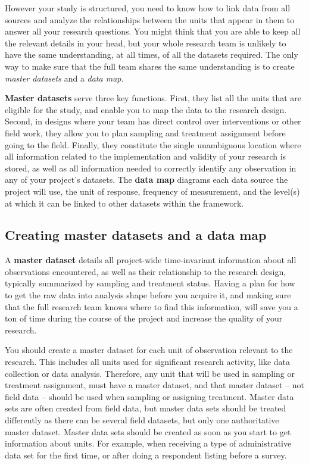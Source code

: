 However your study is structured, you need to know how to link data from all sources
and analyze the relationships between the units that appear in them
to answer all your research questions.
You might think that you are able to keep all the relevant details in your head,
but your whole research team is unlikely to have the same understanding,
at all times, of all the datasets required.
The only way to make sure that the full team shares the same understanding
is to create \textit{master datasets} and a \textit{data map}.

\textbf{Master datasets} serve three key functions.
First, they list all the units that are eligible for the study,
and enable you to map the data to the research design.
Second, in designs where your team has direct control over interventions or other field work,
they allow you to plan sampling and treatment assignment before going to the field.
Finally, they constitute the single unambiguous location where all information 
related to the implementation and validity of your research is stored,
as well as all information needed to correctly identify any observation in any of your project's datasets.
The \textbf{data map} diagrams each data source the project will use, 
the unit of response, frequency of measurement, 
and the level(s) at which it can be linked to other datasets within the framework. 


\subsection{Creating master datasets and a data map}

A \textbf{master dataset}
details all project-wide time-invariant information
about all observations encountered,
as well as their relationship to the research design,
typically summarized by sampling and treatment status.
Having a plan for how to get the raw data into analysis shape 
before you acquire it,
and making sure that the full research team knows where to find this information,
will save you a ton of time during the course of the project
and increase the quality of your research.

You should create a master dataset
for each unit of observation
relevant to the research.
This includes all units used for significant research activity,
like data collection or data analysis.
Therefore, any unit
that will be used in sampling or treatment assignment,
must have a master dataset,
and that master dataset -- not field data --
should be used when sampling or assigning treatment.
Master data sets are often created from field data,
but master data sets should be treated differently
as there can be several field datasets,
but only one authoritative master dataset.
Master data sets should be created as soon as you
start to get information about units.
For example, when receiving a type of administrative data set for the first time,
or after doing a respondent listing before a survey.


